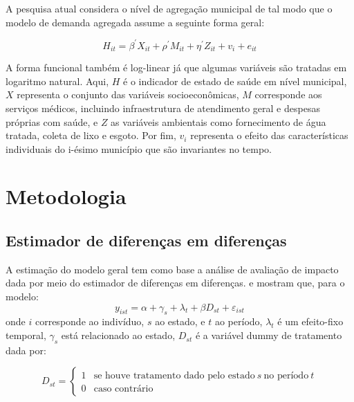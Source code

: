 \documentclass[twoside,onecolumn,12pt]{article}
\numberwithin{outputctr}{section}
\begin{document}
A pesquisa atual considera o nível de agregação municipal de tal modo que o modelo de demanda agregada assume a seguinte forma geral:

\begin{equation}
H_{it} = \beta^{'}X_{it} + \rho^{'}M_{it} + \eta^{'}Z_{it} + v_i + e_{it}
\end{equation}

A forma funcional também é log-linear já que algumas variáveis são tratadas em logaritmo natural. Aqui, $H$ é o indicador de estado de saúde em nível municipal, $X$ representa o conjunto das variáveis socioeconômicas, $M$  corresponde aos serviços médicos, incluindo infraestrutura de atendimento geral e despesas próprias com saúde, e $Z$ as variáveis ambientais como fornecimento de água tratada, coleta de lixo e esgoto. Por fim, $v_i$ representa o efeito das características individuais do i-ésimo município que são invariantes no tempo.


\section{Metodologia \label{secMetodologia}}


\subsection{Estimador de diferen\c{c}as em diferen\c{c}as \label{secEstimadorDiffDiff}}

A estimação do modelo geral tem como base a análise de avaliação de impacto dada por meio do estimador de diferenças em diferenças.  e \cite{bibAngrist2009mostly} mostram que,
para o modelo:
\begin{equation}
 y_{ist} = \alpha + \gamma_s + \lambda_t + \beta D_{st} + \varepsilon_{ist}
 \label{eq_diff_in_diff}
\end{equation}
\noindent onde $i$ corresponde ao indiv\'{i}duo, $s$ ao estado, e $t$ ao per\'{i}odo,
$\lambda_t$ \'{e} um efeito-fixo temporal, $\gamma_s$ est\'{a} relacionado ao estado,
$D_{st}$ \'{e} a vari\'{a}vel dummy de tratamento dada por:

\begin{equation}
 D_{st} = \left\{
 \begin{array}{rl}
  1 & \text{se houve tratamento dado pelo estado} ~ s ~ \text{no per\'{i}odo} ~ t \\
  0 & \text{caso contr\'{a}rio}
 \end{array}
 \right.
\end{equation}
\end{document}
